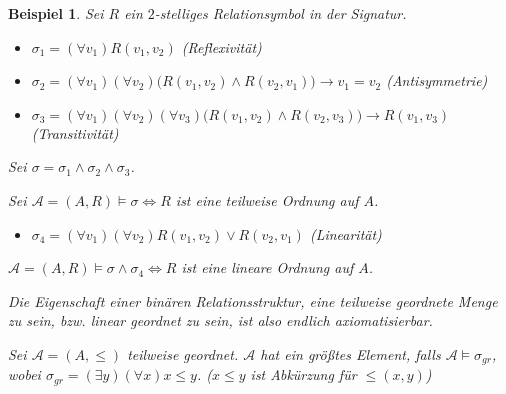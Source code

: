\documentclass{article}
\theoremstyle{definition}
\theoremstyle{plain}
\newtheorem*{bsp}{Beispiel}
\newcommand{\calA}{\mathcal{A}}
\begin{document}
    \begin{bsp}
        Sei $ R $ ein $ 2 $-stelliges Relationsymbol in der Signatur.
        \begin{itemize}
            \item $ \sigma_1 = (\forall v_1) R(v_1, v_2) $ \hfill \textit{(Reflexivität)}
            \item $ \sigma_2 = (\forall v_1) (\forall v_2) \big(R(v_1, v_2) \land R(v_2, v_1)\big) \rightarrow v_1 = v_2 $ \hfill \textit{(Antisymmetrie)}
            \item $ \sigma_3 = (\forall v_1) (\forall v_2) (\forall v_3) \big(R(v_1, v_2) \land R(v_2, v_3)\big) \rightarrow R(v_1, v_3) $ \hfill \textit{(Transitivität)}
        \end{itemize}

        Sei $ \sigma = \sigma_1 \land \sigma_2 \land \sigma_3 $.

        Sei $ \calA = (A, R) \models \sigma \Leftrightarrow R $  ist eine teilweise Ordnung auf $ A $.

        \begin{itemize}
            \item $ \sigma_4 = (\forall v_1) (\forall v_2) R(v_1, v_2) \lor R(v_2, v_1) $ \hfill \textit{(Linearität)}
        \end{itemize}

        $ \calA = (A, R) \models \sigma \land \sigma_4 \Leftrightarrow R $ ist eine lineare Ordnung auf $ A $.

        Die Eigenschaft einer binären Relationsstruktur, eine teilweise geordnete Menge zu sein, bzw. linear geordnet zu sein, ist also endlich axiomatisierbar.

        Sei $ \calA = (A, \leq) $ teilweise geordnet.
        $ \calA $ hat ein größtes Element, falls $ \calA \models \sigma_{gr} $, wobei $ \sigma_{gr} = (\exists y) (\forall x) x \leq y $. \textit{($ x \leq y $ ist Abkürzung für $ \leq(x, y) $)}
    \end{bsp}
\end{document}
